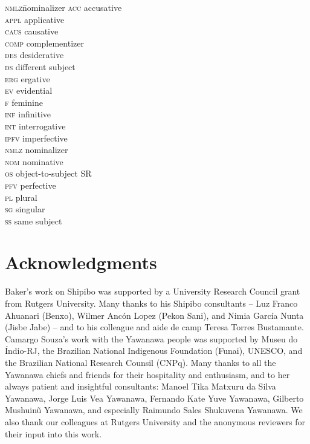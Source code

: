 \documentclass[output=paper]{langscibook}
\begin{document}
\begin{multicols}{2}
\begin{tabbing}
\textsc{nmlz}\hspace{.5ex}\= nominalizer\kill
\textsc{acc}  \> accusative\\
\textsc{appl} \> applicative\\
\textsc{caus} \> causative\\
\textsc{comp} \> complementizer\\
\textsc{des}  \> desiderative\\
\textsc{ds}   \> different subject\\
\textsc{erg}  \> ergative\\
\textsc{ev}   \> evidential\\
\textsc{f}    \> feminine\\
\textsc{inf}  \> infinitive\\
\textsc{int}  \> interrogative\\
\textsc{ipfv} \> imperfective\\
\textsc{nmlz} \> nominalizer\\
\textsc{nom}  \> nominative\\
\textsc{os}   \> object-to-subject SR\\
\textsc{pfv}  \> perfective\\
\textsc{pl}   \> plural\\
\textsc{sg}   \> singular\\
\textsc{ss}   \> same subject\\    
\end{tabbing}
\end{multicols}

\section*{Acknowledgments}
Baker's work on Shipibo was supported by a University Research Council grant from Rutgers University. Many thanks to his Shipibo consultants -- Luz Franco Ahuanari (Benxo), Wilmer Ancón Lopez (Pekon Sani), and Nimia García Nunta (Jisbe Jabe) -- and to his colleague and aide de camp Teresa Torres Bustamante. Camargo Souza's work with the Yawanawa people was supported by Museu do Índio-RJ, the Brazilian National Indigenous Foundation (Funai), UNESCO, and the Brazilian National Research Counsil (CNPq). Many thanks to all the Yawanawa chiefs and friends for their hospitality and enthusiasm, and to her always patient and insightful consultants: Manoel Tika Matxuru da Silva Yawanawa, Jorge Luis Vea Yawanawa, Fernando Kate Yuve Yawanawa, Gilberto Mushuinũ Yawanawa, and especially Raimundo Sales Shukuvena Yawanawa. We also thank our colleagues at Rutgers University and the anonymous reviewers for their input into this work.

\printbibliography[heading=subbibliography,notkeyword=this]
\end{document}
